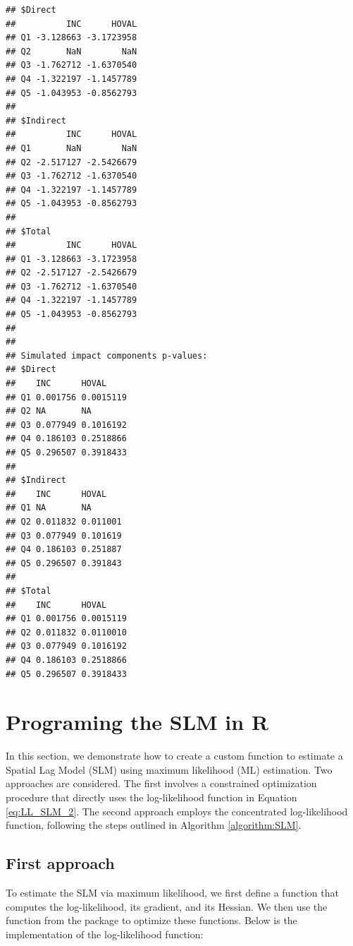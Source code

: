 \documentclass[english,12pt]{book}\usepackage[]{graphicx}\usepackage[]{xcolor}
\makeatletter
\newenvironment{kframe}{%
 \def\at@end@of@kframe{}%
 \ifinner\ifhmode%
  \def\at@end@of@kframe{\end{minipage}}%
  \begin{minipage}{\columnwidth}%
 \fi\fi%
 \def\FrameCommand##1{\hskip\@totalleftmargin \hskip-\fboxsep
 \colorbox{shadecolor}{##1}\hskip-\fboxsep
     \hskip-\linewidth \hskip-\@totalleftmargin \hskip\columnwidth}%
 \MakeFramed {\advance\hsize-\width
   \@totalleftmargin\z@ \linewidth\hsize
   \@setminipage}}%
 {\par\unskip\endMakeFramed%
 \at@end@of@kframe}
\newenvironment{knitrout}{}{} %
\makeatother
\begin{document}
\begin{knitrout}
\begin{kframe}
\begin{verbatim}
## $Direct
##          INC      HOVAL
## Q1 -3.128663 -3.1723958
## Q2       NaN        NaN
## Q3 -1.762712 -1.6370540
## Q4 -1.322197 -1.1457789
## Q5 -1.043953 -0.8562793
## 
## $Indirect
##          INC      HOVAL
## Q1       NaN        NaN
## Q2 -2.517127 -2.5426679
## Q3 -1.762712 -1.6370540
## Q4 -1.322197 -1.1457789
## Q5 -1.043953 -0.8562793
## 
## $Total
##          INC      HOVAL
## Q1 -3.128663 -3.1723958
## Q2 -2.517127 -2.5426679
## Q3 -1.762712 -1.6370540
## Q4 -1.322197 -1.1457789
## Q5 -1.043953 -0.8562793
## 
## 
## Simulated impact components p-values:
## $Direct
##    INC      HOVAL    
## Q1 0.001756 0.0015119
## Q2 NA       NA       
## Q3 0.077949 0.1016192
## Q4 0.186103 0.2518866
## Q5 0.296507 0.3918433
## 
## $Indirect
##    INC      HOVAL   
## Q1 NA       NA      
## Q2 0.011832 0.011001
## Q3 0.077949 0.101619
## Q4 0.186103 0.251887
## Q5 0.296507 0.391843
## 
## $Total
##    INC      HOVAL    
## Q1 0.001756 0.0015119
## Q2 0.011832 0.0110010
## Q3 0.077949 0.1016192
## Q4 0.186103 0.2518866
## Q5 0.296507 0.3918433
\end{verbatim}
\end{kframe}
\end{knitrout}

\section{Programing the SLM in R}

In this section, we demonstrate how to create a custom function to estimate a Spatial Lag Model (SLM) using maximum likelihood (ML) estimation. Two approaches are considered. The first involves a constrained optimization procedure that directly uses the log-likelihood function in Equation \eqref{eq:LL_SLM_2}. The second approach employs the concentrated log-likelihood function, following the steps outlined in Algorithm \eqref{algorithm:SLM}.

\subsection{First approach}\label{sec:code-full-slm}

To estimate the SLM via maximum likelihood, we first define a function that computes the log-likelihood, its gradient, and its Hessian. We then use the  function from the  package \citep{henningsen2011maxlik} to optimize these functions. Below is the implementation of the log-likelihood function:
\end{document}
